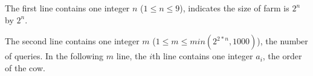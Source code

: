 The first line contains one integer $n$ ($1 \le n \le 9$), indicates the size of farm is $2^n$ by $2^n$.

The second line contains one integer $m$ ($1 \le m \le min(2^{2*n}, 1000)$), the number of queries.
In the following $m$ line, the $i$th line contains one integer $a_i$, the order of the cow.
